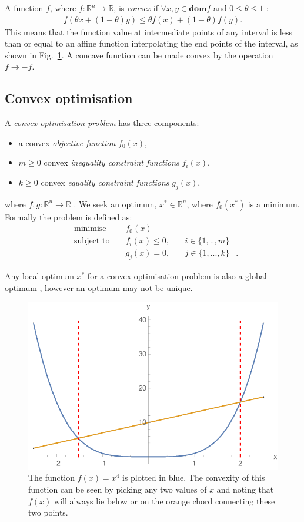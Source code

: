 \documentclass[twocolumn,secnumarabic,amssymb, nobibnotes, aps, prl,superscriptaddress]{revtex4-1}
\begin{document}
\noindent A function $f$, where $f:\mathbb{R}^n \rightarrow \mathbb{R}$, is \textit{convex} if $\forall x,y\in \textbf{dom} f$ and $0 \leqslant \theta \leqslant 1$ \cite[p.67]{cvxpybook}:
\begin{align}
f(\theta x + (1-\theta)y) \leqslant \theta f(x)+(1-\theta)f(y).
\end{align}
This means that the function value at intermediate points of any interval is less than or equal to an affine function interpolating the end points of the interval, as shown in Fig.~\ref{fig:convex}. A concave function can be made convex by the operation $f\to-f$.

\subsection{Convex optimisation}
\noindent A \textit{convex optimisation problem} has three components:
\begin{itemize}
\item a convex \textit{objective function} $f_0(x)$,
\item $m\geqslant0$ convex \textit{inequality constraint functions} $f_i(x)$,
\item $k\geqslant0$ convex \textit{equality constraint functions} $g_j(x)$, 
\end{itemize}
where $f,g: \mathbb{R}^n \rightarrow \mathbb{R}$ \cite[p.141]{cvxpybook}. We seek an optimum, $x^*\in \mathbb{R}^n$, where $f_0(x^*)$ is a minimum. Formally the problem is defined as:
\begin{align} \label{eq:cvxdefn}
&\text{minimise } && f_0(x) & \nonumber &\\
&\text{subject to } && f_i(x) \leqslant 0,\quad & i\in \{1,..,m\}\nonumber &\\
& && g_{j}(x)=0,\quad & j\in \{1,...,k\} &.
\end{align}

Any local optimum $x^*$ for a convex optimisation problem is also a global optimum \cite[pp.138-139]{cvxpybook}, however an optimum may not be unique.

\begin{figure}[h!]
\includegraphics[width=0.9\linewidth]{convex_function.pdf}
\caption{\label{fig:convex}The function $f(x)=x^4$ is plotted in blue. The convexity of this function can be seen by picking any two values of $x$ and noting that $f(x)$ will always lie below or on the orange chord connecting these two points.} 
\end{figure}
\end{document}

